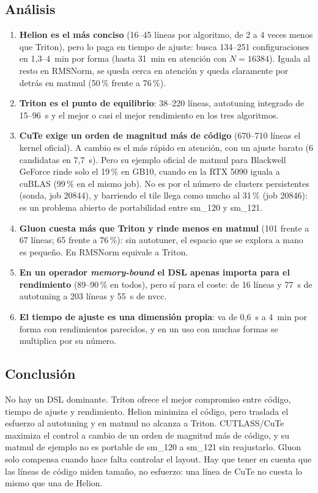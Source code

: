 \subsection{Análisis}

\begin{enumerate}
  \item \textbf{Helion es el más conciso} (16--45 líneas por algoritmo, de 2 a 4 veces menos que
  Triton), pero lo paga en tiempo de ajuste: busca 134--251 configuraciones en 1{,}3--4~min por
  forma (hasta 31~min en atención con $N=16384$). Iguala al resto en RMSNorm, se queda cerca en
  atención y queda claramente por detrás en matmul (50\,\% frente a 76\,\%).
  \item \textbf{Triton es el punto de equilibrio}: 38--220 líneas, autotuning integrado de
  15--96~s y el mejor o casi el mejor rendimiento en los tres algoritmos.
  \item \textbf{CuTe exige un orden de magnitud más de código} (670--710 líneas el kernel
  oficial). A cambio es el más rápido en atención, con un ajuste barato (6 candidatas en
  7{,}7~s). Pero su ejemplo oficial de matmul para Blackwell GeForce rinde solo el 19\,\% en
  GB10, cuando en la RTX 5090 iguala a cuBLAS (99\,\% en el mismo job). No es por el número de
  clusters persistentes (sonda, job 20844), y barriendo el tile llega como mucho al 31\,\% (job
  20846): es un problema abierto de portabilidad entre sm\_120 y sm\_121.
  \item \textbf{Gluon cuesta más que Triton y rinde menos en matmul} (101 frente a 67 líneas;
  65 frente a 76\,\%): sin autotuner, el espacio que se explora a mano es pequeño. En RMSNorm
  equivale a Triton.
  \item \textbf{En un operador \emph{memory-bound} el DSL apenas importa para el rendimiento}
  (89--90\,\% en todos), pero sí para el coste: de 16 líneas y 77~s de autotuning a 203 líneas y
  55~s de nvcc.
  \item \textbf{El tiempo de ajuste es una dimensión propia}: va de 0{,}6~s a 4~min por forma
  con rendimientos parecidos, y en un uso con muchas formas se multiplica por su número.
\end{enumerate}

\subsection{Conclusión}

No hay un DSL dominante. Triton ofrece el mejor compromiso entre código, tiempo de ajuste y
rendimiento. Helion minimiza el código, pero traslada el esfuerzo al autotuning y en matmul no
alcanza a Triton. CUTLASS/CuTe maximiza el control a cambio de un orden de magnitud más de
código, y su matmul de ejemplo no es portable de sm\_120 a sm\_121 sin reajustarlo. Gluon solo
compensa cuando hace falta controlar el layout. Hay que tener en cuenta que las líneas de código
miden tamaño, no esfuerzo: una línea de CuTe no cuesta lo mismo que una de Helion.
